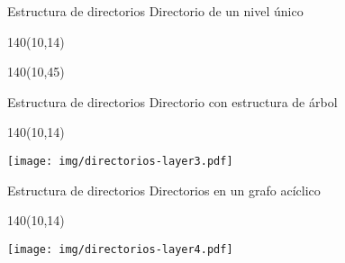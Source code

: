 \documentclass[aspectratio=169]{beamer}
\begin{document}
\begin{frame}[fragile,t]{Estructura de directorios}
    Directorio de un nivel único\\
    \begin{textblock}{140}(10,14)
    \end{textblock}
    \begin{textblock}{140}(10,45)
    \end{textblock}
\end{frame}

\begin{frame}[fragile,t]{Estructura de directorios}
    Directorio con estructura de árbol\\
    \begin{textblock}{140}(10,14)
    \begin{center}
    \texttt{[image: img/directorios-layer3.pdf]}
    \end{center}
    \end{textblock}
\end{frame}

\begin{frame}[fragile,t]{Estructura de directorios}
    Directorios en un grafo acíclico\\
    \begin{textblock}{140}(10,14)
    \begin{center}
    \texttt{[image: img/directorios-layer4.pdf]}
    \end{center}
    \end{textblock}
\end{frame}
\end{document}

